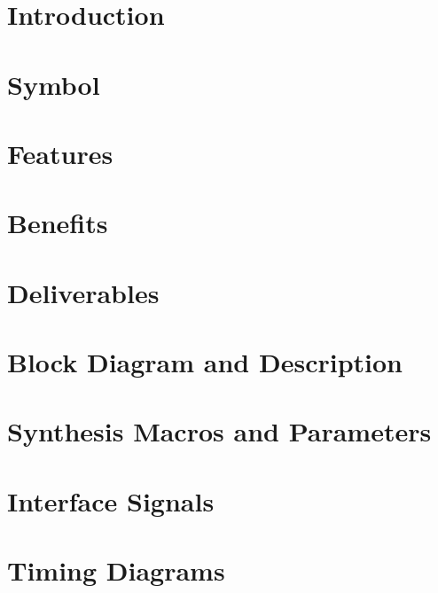 \documentclass{\TEX/ug/ug}
\begin{document}
\maketitle
\cleardoublepage
\tableofcontents
\listoftables
\listoffigures
\cleardoublepage

\section{Introduction}
\label{sec:intro}


\section{Symbol}
\label{sec:symb}


\section{Features}
\label{sec:feat}


\section{Benefits}
\label{sec:benef}


\section{Deliverables}
\label{sec:deliv}


\section{Block Diagram and Description}
\label{sec:bdd}


\ifdefined\SMP
\section{Synthesis Macros and Parameters}
\label{sec:sp}

\fi

\section{Interface Signals}
\label{sec:ifsig}


\ifdefined\TD
\section{Timing Diagrams}
\label{sec:td}

\fi
\end{document}
